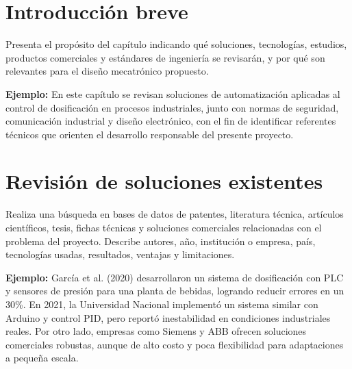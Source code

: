 \documentclass[12pt,letterpaper]{report}
\begin{document}
\section{Introducción breve}
\begin{instrucciones}
Presenta el propósito del capítulo indicando qué soluciones, tecnologías, estudios, productos comerciales y estándares de ingeniería se revisarán, y por qué son relevantes para el diseño mecatrónico propuesto.

\vspace{2mm}
\noindent \textbf{Ejemplo:} En este capítulo se revisan soluciones de automatización aplicadas al control de dosificación en procesos industriales, junto con normas de seguridad, comunicación industrial y diseño electrónico, con el fin de identificar referentes técnicos que orienten el desarrollo responsable del presente proyecto.
\end{instrucciones}

\section{Revisión de soluciones existentes}
\begin{instrucciones}
Realiza una búsqueda en bases de datos de patentes, literatura técnica, artículos científicos, tesis, fichas técnicas y soluciones comerciales relacionadas con el problema del proyecto. Describe autores, año, institución o empresa, país, tecnologías usadas, resultados, ventajas y limitaciones.

\vspace{2mm}
\noindent \textbf{Ejemplo:} García et al. (2020) desarrollaron un sistema de dosificación con PLC y sensores de presión para una planta de bebidas, logrando reducir errores en un 30\%. En 2021, la Universidad Nacional implementó un sistema similar con Arduino y control PID, pero reportó inestabilidad en condiciones industriales reales. Por otro lado, empresas como Siemens y ABB ofrecen soluciones comerciales robustas, aunque de alto costo y poca flexibilidad para adaptaciones a pequeña escala.
\end{instrucciones}
\end{document}
